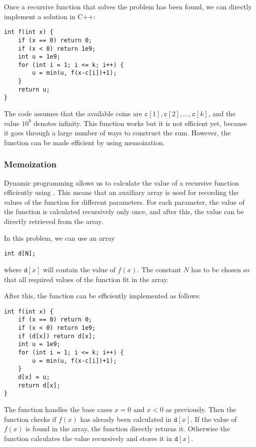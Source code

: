 Once a recursive function that solves the problem
has been found,
we can directly implement a solution in C++:

\begin{lstlisting}
int f(int x) {
    if (x == 0) return 0;
    if (x < 0) return 1e9;
    int u = 1e9;
    for (int i = 1; i <= k; i++) {
        u = min(u, f(x-c[i])+1);
    }
    return u;
}
\end{lstlisting}

The code assumes that the available coins are
$\texttt{c}[1], \texttt{c}[2], \ldots, \texttt{c}[k]$,
and the value $10^9$ denotes infinity.
This function works but it is not efficient yet,
because it goes through a large number
of ways to construct the sum.
However, the function can be made efficient by
using memoization.

\subsubsection{Memoization}


Dynamic programming allows us to calculate the
value of a recursive function efficiently
using .
This means that an auxiliary array is used
for recording the values of the function
for different parameters.
For each parameter, the value of the function
is calculated recursively only once, and after this,
the value can be directly retrieved from the array.

In this problem, we can use an array
\begin{lstlisting}
int d[N];
\end{lstlisting}

where $\texttt{d}[x]$ will contain
the value of $f(x)$.
The constant $N$ has to be chosen so
that all required values of the function fit
in the array.

After this, the function can be efficiently
implemented as follows:

\begin{lstlisting}
int f(int x) {
    if (x == 0) return 0;
    if (x < 0) return 1e9;
    if (d[x]) return d[x];
    int u = 1e9;
    for (int i = 1; i <= k; i++) {
        u = min(u, f(x-c[i])+1);
    }
    d[x] = u;
    return d[x];
}
\end{lstlisting}

The function handles the base cases
$x=0$ and $x<0$ as previously.
Then the function checks if
$f(x)$ has already been calculated
in $\texttt{d}[x]$.
If the value of $f(x)$ is found in the array,
the function directly returns it.
Otherwise the function calculates the value
recursively and stores it in $\texttt{d}[x]$.

